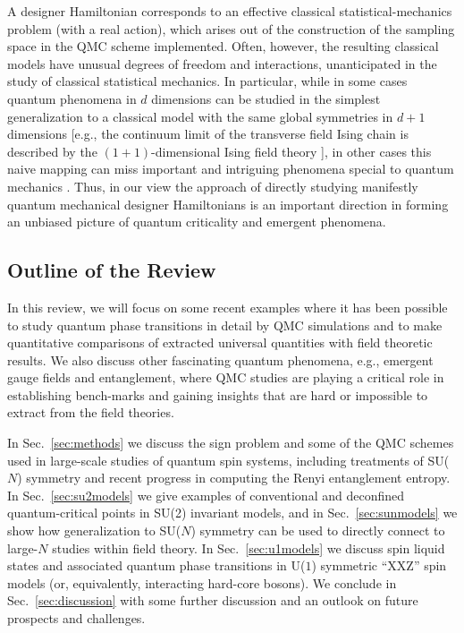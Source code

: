 \documentclass[range]{ar2e}
\begin{document}
A designer Hamiltonian corresponds to an effective classical statistical-mechanics problem (with a real action), which arises out of the construction of the sampling 
space in the QMC scheme implemented. Often, however, the resulting classical models have unusual degrees of freedom and interactions, unanticipated in the study 
of classical statistical mechanics. In particular, while in some cases quantum phenomena in $d$ dimensions can be studied in the simplest generalization to a 
classical model with the same global symmetries in $d+1$ dimensions \cite{Rieger94,Sorensen92,Nahum11} [e.g., the continuum limit of the transverse field 
Ising chain is described by the $(1+1)$-dimensional Ising field theory \cite{Sachdev11}], in other cases this naive mapping can miss important and intriguing 
phenomena special to quantum mechanics \cite{Senthil04a,Fradkin04,Sachdev08}. Thus, in our view the approach of directly studying manifestly quantum mechanical 
designer Hamiltonians is an important direction in forming an unbiased picture of quantum criticality and emergent phenomena.

\subsection{Outline of the Review}

In this review, we will focus on some recent examples where it has been possible to study quantum phase transitions in detail 
by QMC simulations and to make quantitative comparisons of extracted universal quantities with field theoretic results. We also discuss other fascinating quantum phenomena, e.g., emergent gauge fields and entanglement, where QMC studies are
playing a critical role in establishing bench-marks and gaining insights that are hard or impossible to extract from the field theories.

In Sec.~\ref{sec:methods} we discuss the sign problem and some of the QMC schemes used in large-scale studies of quantum spin systems, 
including treatments of SU($N$) symmetry and recent progress in computing the Renyi entanglement entropy. In Sec.~\ref{sec:su2models} 
we give examples of conventional and deconfined quantum-critical points in SU(2) invariant models, and in Sec.~\ref{sec:sunmodels} 
we show how generalization to SU($N$) symmetry can be used to directly connect to large-$N$ studies within field theory. In Sec.~\ref{sec:u1models} 
we discuss spin liquid states and associated quantum phase transitions in U($1$) symmetric ``XXZ'' spin models (or, equivalently, interacting hard-core 
bosons). We conclude in Sec.~\ref{sec:discussion} with some further discussion and an outlook on future prospects and challenges.
\end{document}
